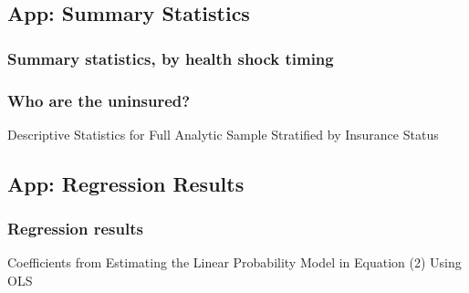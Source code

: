 \documentclass[10pt,compress,xcolor=dvipsnames,aspectratio=169]{beamer}    %
\newcounter{ex}
\newcommand{\1}[1]{\mathrm{1\hspace*{-2.5pt}l}[#1]}	%
\begin{document}
\subsection{App: Summary Statistics}
\begin{frame}
\frametitle{Summary statistics, by health shock timing}\label{frame:sumstats2}

\begin{table}[ht]
	\small\resizebox{0.8\textheight}{!}{
		
	}
\end{table}


\hyperlink{frame:sumstats}{}
\hyperlink{frame:limit}{}
\end{frame}

\begin{frame}
\frametitle{Who are the uninsured?}\label{frame:uninsured}
\begin{table}[ht]
	\caption{Descriptive Statistics for Full Analytic Sample Stratified by Insurance Status}
	\small\resizebox{1.3\textheight}{!}{
		
	}
\end{table}

\hyperlink{frame:sumstats}{}
\hyperlink{frame:vars}{}

\end{frame}



\subsection{App: Regression Results}
\begin{frame}
\frametitle{Regression results} \label{frame:fullreg}
{\scriptsize Coefficients from Estimating the Linear Probability Model in Equation (2) Using OLS} \hyperlink{fig:maincoeffplot}{}

\begin{table}[ht]
	\resizebox{0.8\textheight}{!}{
		
	}
\end{table}


\end{frame}
\end{document}

